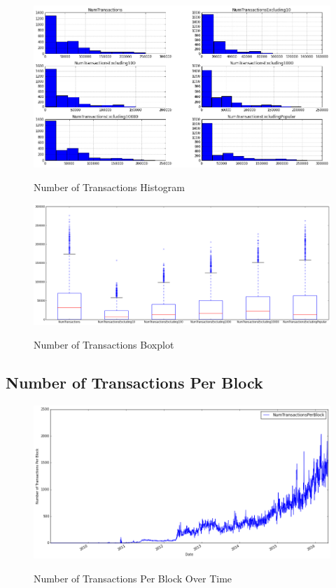 \begin{figure}[bth]
  \myfloatalign
  {\includegraphics[width=1\linewidth]
    {gfx/n-transactions-multiple-histogram}}
  \caption{Number of Transactions Histogram}
  \label{fig:n-transactions-multiple-histogram}
\end{figure}

\begin{figure}[bth]
  \myfloatalign
  {\includegraphics[width=1\linewidth]
    {gfx/n-transactions-multiple-boxplot}}
  \caption{Number of Transactions Boxplot}
  \label{fig:n-transactions-multiple-boxplot}
\end{figure}

\clearpage

\subsection{Number of Transactions Per Block}
\label{sec:n-transactions-per-block}

\begin{figure}[bth]
  \myfloatalign
  {\includegraphics[width=1\linewidth]
    {gfx/n-transactions-per-block-over-time}}
  \caption{Number of Transactions Per Block
    Over Time}
  \label{fig:n-transactions-per-block-over-time}
\end{figure}

